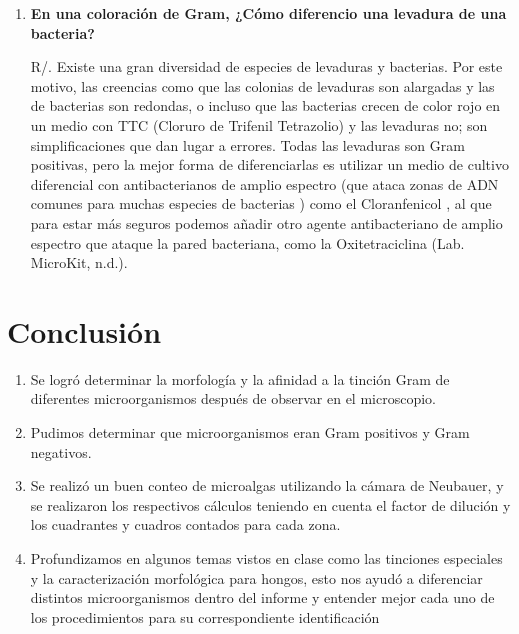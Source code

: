 \documentclass[journal,transmag]{IEEEtran}
\begin{document}
\begin{enumerate}
	\item \textbf{En una coloración de Gram, ¿Cómo diferencio una levadura de una bacteria?}
	
	R/. Existe una gran diversidad de especies de levaduras y bacterias. Por este motivo, las creencias como que las colonias de levaduras son alargadas y las de bacterias son redondas, o incluso que las bacterias crecen de color rojo en un medio con TTC (Cloruro de Trifenil Tetrazolio) y las levaduras no; son simplificaciones que dan lugar a errores. Todas las levaduras son Gram positivas, pero la mejor forma de diferenciarlas es utilizar un medio de cultivo diferencial con antibacterianos de amplio espectro (que ataca zonas de ADN comunes para muchas especies de bacterias ) como el Cloranfenicol , al que para estar más seguros podemos añadir otro agente antibacteriano de amplio espectro que ataque la pared bacteriana, como la Oxitetraciclina (Lab. MicroKit, n.d.).

	
\end{enumerate}

\section{Conclusión}
	
	\begin{enumerate}[label=(\roman*)]
	
    \item Se logró determinar la morfología y la afinidad a la tinción Gram de diferentes microorganismos después de observar en el microscopio.
    \item  Pudimos determinar que microorganismos eran Gram positivos y Gram negativos. 
    
    \item  Se realizó un buen conteo de microalgas utilizando la cámara de Neubauer, y se realizaron los respectivos cálculos teniendo en cuenta el factor de dilución y los cuadrantes y cuadros contados para cada zona. 
    \item Profundizamos en algunos temas vistos en clase como las tinciones especiales y la caracterización morfológica para hongos, esto nos ayudó a diferenciar distintos microorganismos dentro del informe y entender mejor cada uno de los procedimientos para su correspondiente identificación

   
	\end{enumerate}

\appendices


\ifCLASSOPTIONcaptionsoff
  \newpage
\fi
\end{document}
